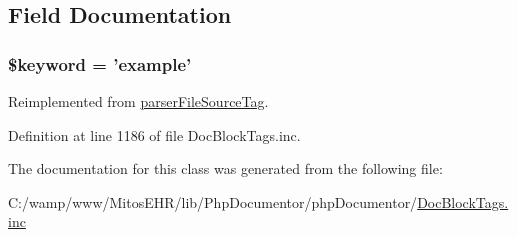\subsection{\-Field \-Documentation}
\hypertarget{classparser_example_tag_a4a925d6b38bcf3957c713a7d3dc7da1f}{
\subsubsection[{\$keyword}]{\setlength{\rightskip}{0pt plus 5cm}\$keyword = 'example'}}\label{classparser_example_tag_a4a925d6b38bcf3957c713a7d3dc7da1f}


\-Reimplemented from \hyperlink{classparser_file_source_tag_a4a925d6b38bcf3957c713a7d3dc7da1f}{parser\-File\-Source\-Tag}.



\-Definition at line 1186 of file \-Doc\-Block\-Tags.\-inc.



\-The documentation for this class was generated from the following file\-:\begin{DoxyCompactItemize}
\item 
\-C\-:/wamp/www/\-Mitos\-E\-H\-R/lib/\-Php\-Documentor/php\-Documentor/\hyperlink{_doc_block_tags_8inc}{\-Doc\-Block\-Tags.\-inc}\end{DoxyCompactItemize}
